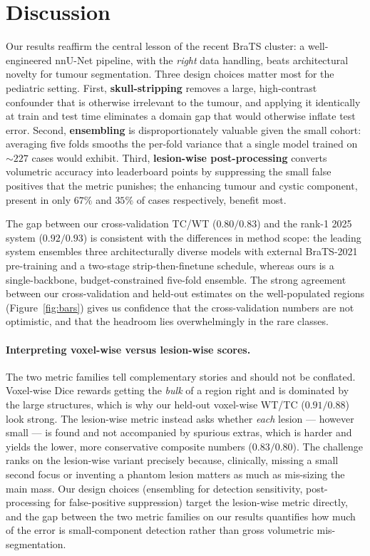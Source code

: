 \documentclass[11pt,a4paper]{article}
\begin{document}
\section{Discussion}
\label{sec:discussion}
Our results reaffirm the central lesson of the recent BraTS cluster: a
well-engineered nnU-Net pipeline, with the \emph{right} data handling, beats
architectural novelty for tumour segmentation. Three design choices matter most for
the pediatric setting. First, \textbf{skull-stripping} removes a large, high-contrast
confounder that is otherwise irrelevant to the tumour, and applying it identically at
train and test time eliminates a domain gap that would otherwise inflate test error.
Second, \textbf{ensembling} is disproportionately valuable given the small cohort:
averaging five folds smooths the per-fold variance that a single model trained on
$\sim\!227$ cases would exhibit. Third, \textbf{lesion-wise post-processing} converts
volumetric accuracy into leaderboard points by suppressing the small false positives
that the metric punishes; the enhancing tumour and cystic component, present in only
$67\%$ and $35\%$ of cases respectively, benefit most.

The gap between our cross-validation TC/WT ($0.80/0.83$) and the rank-1 2025 system
($0.92/0.93$) is consistent with the differences in method scope: the leading system
ensembles three architecturally diverse models with external BraTS-2021 pre-training
and a two-stage strip-then-finetune schedule, whereas ours is a single-backbone,
budget-constrained five-fold ensemble. The strong agreement between our
cross-validation and held-out estimates on the well-populated regions
(Figure~\ref{fig:bars}) gives us confidence that the cross-validation numbers are not
optimistic, and that the headroom lies overwhelmingly in the rare classes.

\paragraph{Interpreting voxel-wise versus lesion-wise scores.}
The two metric families tell complementary stories and should not be conflated.
Voxel-wise Dice rewards getting the \emph{bulk} of a region right and is dominated by
the large structures, which is why our held-out voxel-wise WT/TC ($0.91/0.88$) look
strong. The lesion-wise metric instead asks whether \emph{each} lesion --- however
small --- is found and not accompanied by spurious extras, which is harder and yields
the lower, more conservative composite numbers ($0.83/0.80$). The challenge ranks on
the lesion-wise variant precisely because, clinically, missing a small second focus or
inventing a phantom lesion matters as much as mis-sizing the main mass. Our design
choices (ensembling for detection sensitivity, post-processing for false-positive
suppression) target the lesion-wise metric directly, and the gap between the two metric
families on our results quantifies how much of the error is small-component detection
rather than gross volumetric mis-segmentation.
\end{document}
